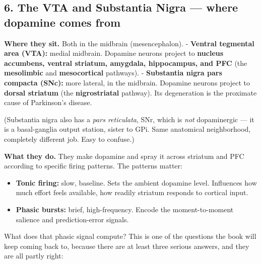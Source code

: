 \subsection{6. The VTA and Substantia Nigra --- where dopamine comes from}\label{06_neurology_101-the-vta-and-substantia-nigra-where-dopamine-comes-from}

\textbf{Where they sit.} Both in the midbrain (mesencephalon). - \textbf{Ventral tegmental area (VTA):} medial midbrain. Dopamine neurons project to \textbf{nucleus accumbens, ventral striatum, amygdala, hippocampus, and PFC} (the \textbf{mesolimbic} and \textbf{mesocortical} pathways). - \textbf{Substantia nigra pars compacta (SNc):} more lateral, in the midbrain. Dopamine neurons project to \textbf{dorsal striatum} (the \textbf{nigrostriatal} pathway). Its degeneration is the proximate cause of Parkinson's disease.

(Substantia nigra also has a \emph{pars reticulata}, SNr, which is \emph{not} dopaminergic --- it is a basal-ganglia output station, sister to GPi. Same anatomical neighborhood, completely different job. Easy to confuse.)

\textbf{What they do.} They make dopamine and spray it across striatum and PFC according to specific firing patterns. The patterns matter:

\begin{itemize}
\tightlist
\item
  \textbf{Tonic firing:} slow, baseline. Sets the ambient dopamine level. Influences how much effort feels available, how readily striatum responds to cortical input.
\item
  \textbf{Phasic bursts:} brief, high-frequency. Encode the moment-to-moment salience and prediction-error signals.
\end{itemize}

What does that phasic signal compute? This is one of the questions the book will keep coming back to, because there are at least three serious answers, and they are all partly right:

